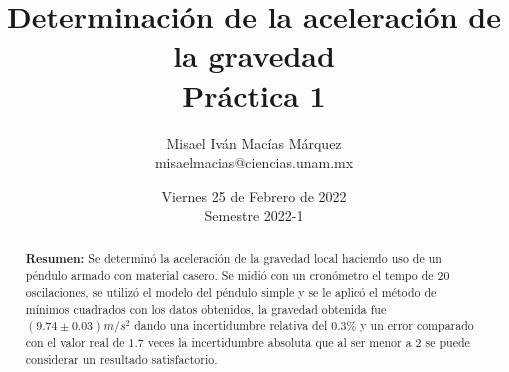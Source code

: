 \documentclass[DIV=calc, paper=a4, fontsize=11pt]{scrartcl}
\title{Determinación de la aceleración de la gravedad\\ %
Práctica 1} %
\author{Misael Iván Macías Márquez\\
misaelmacias@ciencias.unam.mx}
\date{Viernes 25 de Febrero de 2022\\Semestre 2022-1}
\begin{document}
\maketitle


\begin{abstract}
\textbf{Resumen:} Se determinó la aceleración de la gravedad local haciendo uso de un péndulo armado con material casero. Se midió con un cronómetro el tempo de 20 oscilaciones, se utilizó el modelo del péndulo simple y se le aplicó el método de mínimos cuadrados con los datos obtenidos, la gravedad obtenida fue $(9.74 \pm 0.03)m/s^2$ dando una incertidumbre relativa del $0.3 \%$ y un error comparado con el valor real de $1.7$ veces la incertidumbre absoluta que al ser menor a $2$ se puede considerar un resultado satisfactorio.


\end{abstract}
\end{document}

